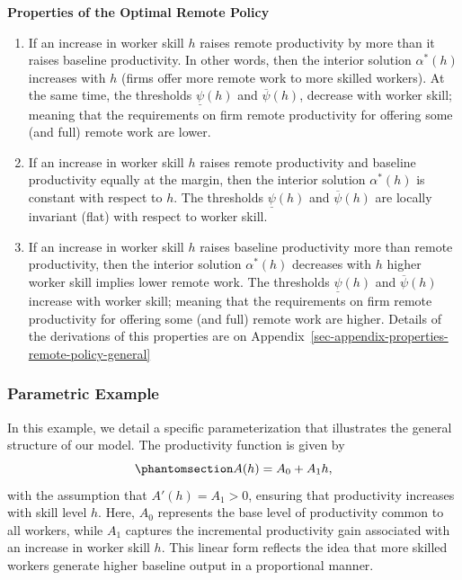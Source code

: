 \documentclass[
  11pt,
  letterpaper,
  DIV=11,
  numbers=noendperiod]{scrartcl}
\providecommand{\tightlist}{%
  \setlength{\itemsep}{0pt}\setlength{\parskip}{0pt}}\usepackage{longtable,booktabs,array}
\theoremstyle{plain}
\theoremstyle{remark}
\begin{document}
\textbf{Properties of the Optimal Remote Policy}

\begin{enumerate}
\def\labelenumi{\arabic{enumi}.}
\tightlist
\item
  If an increase in worker skill \(h\) raises remote productivity by
  more than it raises baseline productivity. In other words, then the
  interior solution \(\alpha^*(h)\) increases with \(h\) (firms offer
  more remote work to more skilled workers). At the same time, the
  thresholds \(\underline{\psi}(h)\) and \(\overline{\psi}(h)\),
  decrease with worker skill; meaning that the requirements on firm
  remote productivity for offering some (and full) remote work are
  lower.
\item
  If an increase in worker skill \(h\) raises remote productivity and
  baseline productivity equally at the margin, then the interior
  solution \(\alpha^*(h)\) is constant with respect to \(h\). The
  thresholds \(\underline{\psi}(h)\) and \(\overline{\psi}(h)\) are
  locally invariant (flat) with respect to worker skill.
\item
  If an increase in worker skill \(h\) raises baseline productivity more
  than remote productivity, then the interior solution \(\alpha^*(h)\)
  decreases with \(h\) higher worker skill implies lower remote work.
  The thresholds \(\underline{\psi}(h)\) and \(\overline{\psi}(h)\)
  increase with worker skill; meaning that the requirements on firm
  remote productivity for offering some (and full) remote work are
  higher. Details of the derivations of this properties are on
  Appendix~\ref{sec-appendix-properties-remote-policy-general}
\end{enumerate}

\subsubsection{Parametric Example}\label{parametric-example}

In this example, we detail a specific parameterization that illustrates
the general structure of our model. The productivity function is given
by\begin{equation}\phantomsection\label{eq-prod-skill-example}{
A(h)=A_0+A_1h,}\end{equation} with the assumption that \(A'(h)=A_1>0\),
ensuring that productivity increases with skill level \(h\). Here,
\(A_0\) represents the base level of productivity common to all workers,
while \(A_1\) captures the incremental productivity gain associated with
an increase in worker skill \(h\). This linear form reflects the idea
that more skilled workers generate higher baseline output in a
proportional manner.
\end{document}
